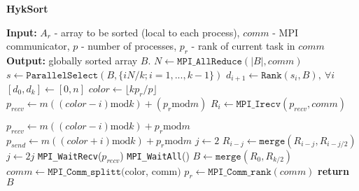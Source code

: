 \begin{algorithm}
    \caption{\textbf{HykSort}}
    \begin{algorithmic}
        \STATE \textbf{Input:} $A_r$ - array to be sorted (local to each process), $comm$ - MPI communicator, $p$ - number of processes, $p_r$ - rank of current task in $comm$
        \STATE \textbf{Output:} globally sorted array $B$.
            \STATE $N \gets \texttt{MPI\_AllReduce}(|B|, comm)$
            \STATE $s \gets \texttt{ParallelSelect}(B, \{i N/k ; i=1,...,k-1 \})$
            \STATE $d_{i+1} \gets \texttt{Rank}(s_i, B), \> \forall i$
            \STATE $[d_0, d_k] \gets [0, n]$
            \STATE $color \gets \lfloor k p_r/p \rfloor$
                \STATE $p_{recv} \gets m((color-i)\text{mod}k)+(p_r \text{mod}m)$
                \STATE $R_i \gets \texttt{MPI\_Irecv}(p_{recv}, comm)$
            \ENDPARFOR

                \STATE $p_{recv} \gets m((color-i)\text{mod}k)+p_r \text{mod}m$
                \STATE $p_{send} \gets m((color+i)\text{mod}k)+p_r \text{mod}m$
                \STATE $j \gets 2$
                    \STATE $R_{i-j} \gets \texttt{merge}(R_{i-j}, R_{i-j/2})$
                    \STATE $j \gets 2j$
                \ENDWHILE
                \STATE \texttt{MPI\_WaitRecv}($p_{recv}$)
            \ENDFOR
            \STATE \texttt{MPI\_WaitAll}()
            \STATE $B \gets \texttt{merge}(R_0, R_{k/2})$
            \STATE $comm \gets \texttt{MPI\_Comm\_splitt}($color, comm$)$
            \STATE $p_r \gets \texttt{MPI\_Comm\_rank}(comm)$
        \ENDWHILE
        \STATE \textbf{return } $B$
    \end{algorithmic}
\end{algorithm}


